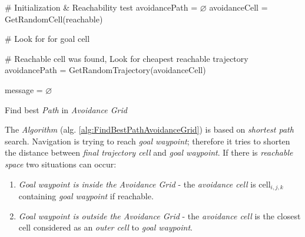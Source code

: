 \begin{algorithm}[H]
    
    
    \BlankLine
    \# Initialization \& Reachability test\;    
    avoidancePath = $\varnothing$\;
    avoidanceCell = GetRandomCell(reachable)\;
    
    \BlankLine
    \# Look for for goal cell\;
    
    \BlankLine
    \# Reachable cell was found, Look for cheapest reachable trajectory\;
    avoidancePath = GetRandomTrajectory(avoidanceCell)\;
   
    message = $\varnothing$\;
    
    \caption{Find best \emph{Path} in \emph{Avoidance Grid}}
    \label{alg:FindBestPathAvoidanceGrid}    
\end{algorithm}


The \emph{Algorithm} (alg. \ref{alg:FindBestPathAvoidanceGrid}) is based on \emph{shortest path} search. Navigation is trying to reach \emph{goal waypoint};  therefore it tries to shorten the distance between \emph{final trajectory cell} and \emph{goal waypoint}. If there is \emph{reachable space} two situations can occur:
\begin{enumerate}
    \item \emph{Goal waypoint is inside the Avoidance Grid} - the \emph{avoidance cell} is cell$_{i,j,k}$ containing \emph{goal waypoint} if reachable. 
    
    \item \emph{Goal waypoint is outside the Avoidance Grid} - the \emph{avoidance cell} is the closest cell considered as an \emph{outer cell} to \emph{goal waypoint}.
\end{enumerate}

